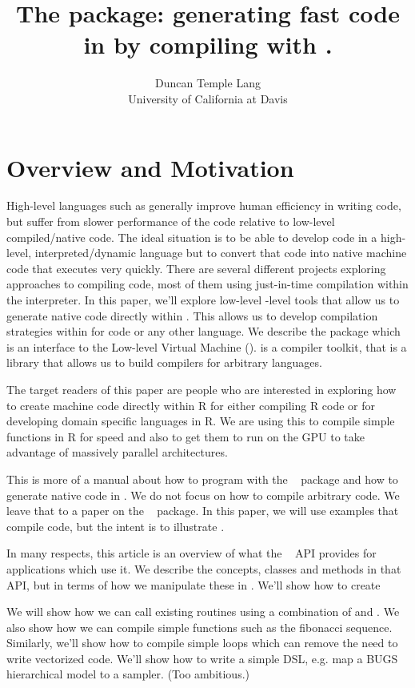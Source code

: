 \documentclass[article]{jss}
\author{Duncan Temple Lang\\University of California at Davis}
\title{The \Rpkg{Rllvm} package: generating fast code in \R{} by compiling with \llvm.}
\def\RClang{\Rpkg{RCIndex}}
\def\Rllvm{\Rpkg{Rllvm}}
\begin{document}
\section{Overview and Motivation}\label{sec:Introduction}

High-level languages such as \R{} generally improve human efficiency
in writing code, but suffer from slower performance of the code
relative to low-level compiled/native code.  The ideal situation is to
be able to develop code in a high-level, interpreted/dynamic language
but to convert that code into native machine code that executes very
quickly. There are several different projects exploring approaches to
compiling \R{} code, most of them using just-in-time compilation
within the interpreter.  In this paper, we'll explore low-level
\R-level tools that allow us to generate native code directly within
\R.  This allows us to develop compilation strategies within \R{} for
\R{} code or any other language.  We describe the  package
which is an interface to the Low-level Virtual Machine (\llvm).
\llvm{} is a compiler toolkit, that is a \Cpp{} library that allows us
to build compilers for arbitrary languages.


The target readers of this paper are people who are interested in
exploring how to create machine code directly within R for either
compiling R code or for developing domain specific languages in R.  We
are using this to compile simple functions in R for speed and also to
get them to run on the GPU to take advantage of massively parallel
architectures.

This is more of a manual about how to program with the
~\cite{bib:Rllvm} package and how to generate native code
in \R.  We do not focus on how to compile arbitrary \R{} code.  We
leave that to a paper on the
~\cite{bib:RLLVMCompile} package.  In this paper,
we will use examples that compile \R{} code, but the intent is to
illustrate .

In many respects, this article is an overview of what the \llvm~\cite{bib:llvm}
API provides for applications which use it. We describe the concepts,
classes and methods in that API, but in terms of how we manipulate these
in \R.
We'll show how to create

We will show how we can call existing \C{} routines using a
combination of \RClang{} and \Rllvm.  We also show how we can compile
simple functions such as the fibonacci sequence.  Similarly, we'll
show how to compile simple loops which can remove the need to write
vectorized code.  We'll show how to write a simple DSL, e.g. map a
BUGS hierarchical model to a sampler. (Too ambitious.)
\end{document}
